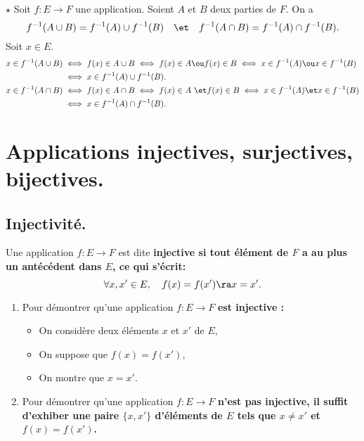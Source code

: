 \documentclass[11pt]{article}
\begin{document}
\begin{prop}{$\star$}{}
    Soit $f:E\to F$ une application. Soient $A$ et $B$ deux parties de $F$. On a
    \begin{equation*}
        f^{-1}(A\cup B)=f^{-1}(A)\cup f^{-1}(B) \quad\et\quad f^{-1}(A\cap B)=f^{-1}(A)\cap f^{-1}(B).
    \end{equation*}
    \tcblower
    Soit $x\in E$.
    \begin{align*}
        x \in f^{-1}(A\cup B) &\iff f(x) \in A \cup B \iff f(x) \in A \ou f(x) \in B \iff x \in f^{-1}(A) \ou x\in f^{-1}(B)\\
        &\iff x\in f^{-1}(A)\cup f^{-1}(B).\\
        x \in f^{-1}(A\cap B) &\iff f(x) \in A \cap B \iff f(x) \in A ~\et f(x) \in B \iff x \in f^{-1}(A) \et x \in f^{-1}(B)\\
        &\iff x \in f^{-1}(A)\cap f^{-1}(B).
    \end{align*}
\end{prop}

\section{Applications injectives, surjectives, bijectives.}

\subsection{Injectivité.}

\begin{defi}{}{}
    Une application $f:E\to F$ est dite \bf{injective} si tout élément de $F$ a au plus un antécédent dans $E$, ce qui s'écrit:
    \begin{equation*}
        \forall x,x' \in E, \quad f(x) = f(x') \ra x = x'.
    \end{equation*}
\end{defi}

\begin{meth}{}{}
    \begin{enumerate}
        \item Pour démontrer qu'une application $f:E\to F$ \bf{est} injective :
        \begin{itemize}
            \item On considère deux éléments $x$ et $x'$ de $E$,
            \item On suppose que $f(x)=f(x')$,
            \item On montre que $x=x'$.
        \end{itemize}
        \item Pour démontrer qu'une application $f:E\to F$ \bf{n'est pas} injective, il suffit d'exhiber une paire $\{x,x'\}$ d'éléments de $E$ tels que $x\neq x'$ et $f(x)=f(x')$.
    \end{enumerate}
\end{meth}
\end{document}
